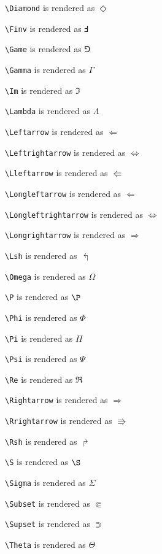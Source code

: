 \texttt{\textbackslash Diamond} is rendered as $\Diamond$

\texttt{\textbackslash Finv} is rendered as $\Finv$

\texttt{\textbackslash Game} is rendered as $\Game$

\texttt{\textbackslash Gamma} is rendered as $\Gamma$

\texttt{\textbackslash Im} is rendered as $\Im$

\texttt{\textbackslash Lambda} is rendered as $\Lambda$

\texttt{\textbackslash Leftarrow} is rendered as $\Leftarrow$

\texttt{\textbackslash Leftrightarrow} is rendered as $\Leftrightarrow$

\texttt{\textbackslash Lleftarrow} is rendered as $\Lleftarrow$

\texttt{\textbackslash Longleftarrow} is rendered as $\Longleftarrow$

\texttt{\textbackslash Longleftrightarrow} is rendered as $\Longleftrightarrow$

\texttt{\textbackslash Longrightarrow} is rendered as $\Longrightarrow$

\texttt{\textbackslash Lsh} is rendered as $\Lsh$

\texttt{\textbackslash Omega} is rendered as $\Omega$

\texttt{\textbackslash P} is rendered as $\P$

\texttt{\textbackslash Phi} is rendered as $\Phi$

\texttt{\textbackslash Pi} is rendered as $\Pi$

\texttt{\textbackslash Psi} is rendered as $\Psi$

\texttt{\textbackslash Re} is rendered as $\Re$

\texttt{\textbackslash Rightarrow} is rendered as $\Rightarrow$

\texttt{\textbackslash Rrightarrow} is rendered as $\Rrightarrow$

\texttt{\textbackslash Rsh} is rendered as $\Rsh$

\texttt{\textbackslash S} is rendered as $\S$

\texttt{\textbackslash Sigma} is rendered as $\Sigma$

\texttt{\textbackslash Subset} is rendered as $\Subset$

\texttt{\textbackslash Supset} is rendered as $\Supset$

\texttt{\textbackslash Theta} is rendered as $\Theta$

